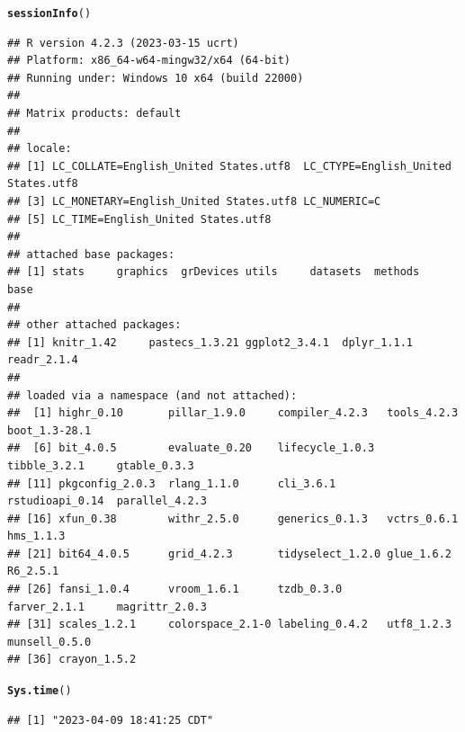 \documentclass{article}\usepackage[]{graphicx}\usepackage[]{xcolor}
\makeatletter
\newcommand{\hlstd}[1]{\textcolor[rgb]{0.345,0.345,0.345}{#1}}%
\newcommand{\hlkwd}[1]{\textcolor[rgb]{0.737,0.353,0.396}{\textbf{#1}}}%
\newenvironment{kframe}{%
 \def\at@end@of@kframe{}%
 \ifinner\ifhmode%
  \def\at@end@of@kframe{\end{minipage}}%
  \begin{minipage}{\columnwidth}%
 \fi\fi%
 \def\FrameCommand##1{\hskip\@totalleftmargin \hskip-\fboxsep
 \colorbox{shadecolor}{##1}\hskip-\fboxsep
     \hskip-\linewidth \hskip-\@totalleftmargin \hskip\columnwidth}%
 \MakeFramed {\advance\hsize-\width
   \@totalleftmargin\z@ \linewidth\hsize
   \@setminipage}}%
 {\par\unskip\endMakeFramed%
 \at@end@of@kframe}
\newenvironment{knitrout}{}{} %
\makeatother
\begin{document}
\begin{knitrout}
\color{fgcolor}\begin{kframe}
\begin{alltt}
\hlkwd{sessionInfo}\hlstd{()}
\end{alltt}
\begin{verbatim}
## R version 4.2.3 (2023-03-15 ucrt)
## Platform: x86_64-w64-mingw32/x64 (64-bit)
## Running under: Windows 10 x64 (build 22000)
## 
## Matrix products: default
## 
## locale:
## [1] LC_COLLATE=English_United States.utf8  LC_CTYPE=English_United States.utf8   
## [3] LC_MONETARY=English_United States.utf8 LC_NUMERIC=C                          
## [5] LC_TIME=English_United States.utf8    
## 
## attached base packages:
## [1] stats     graphics  grDevices utils     datasets  methods   base     
## 
## other attached packages:
## [1] knitr_1.42     pastecs_1.3.21 ggplot2_3.4.1  dplyr_1.1.1    readr_2.1.4   
## 
## loaded via a namespace (and not attached):
##  [1] highr_0.10       pillar_1.9.0     compiler_4.2.3   tools_4.2.3      boot_1.3-28.1   
##  [6] bit_4.0.5        evaluate_0.20    lifecycle_1.0.3  tibble_3.2.1     gtable_0.3.3    
## [11] pkgconfig_2.0.3  rlang_1.1.0      cli_3.6.1        rstudioapi_0.14  parallel_4.2.3  
## [16] xfun_0.38        withr_2.5.0      generics_0.1.3   vctrs_0.6.1      hms_1.1.3       
## [21] bit64_4.0.5      grid_4.2.3       tidyselect_1.2.0 glue_1.6.2       R6_2.5.1        
## [26] fansi_1.0.4      vroom_1.6.1      tzdb_0.3.0       farver_2.1.1     magrittr_2.0.3  
## [31] scales_1.2.1     colorspace_2.1-0 labeling_0.4.2   utf8_1.2.3       munsell_0.5.0   
## [36] crayon_1.5.2
\end{verbatim}
\begin{alltt}
\hlkwd{Sys.time}\hlstd{()}
\end{alltt}
\begin{verbatim}
## [1] "2023-04-09 18:41:25 CDT"
\end{verbatim}
\end{kframe}
\end{knitrout}
\end{document}
